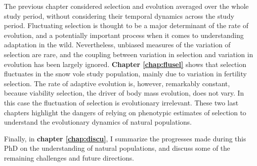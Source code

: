 The previous chapter considered selection and evolution averaged over the whole study period, without considering their temporal dynamics across the study period. Fluctuating selection is thought to be a major determinant of the rate of evolution, and a potentially important process when it comes to understanding adaptation in the wild. 
Nevertheless, unbiased measures of the variation of selection are rare, and the coupling between variation in selection and variation in evolution has been largely ignored. \textbf{Chapter \ref{chap:flusel}} shows that selection fluctuates in the snow vole study population, mainly due to variation in fertility selection. The rate of adaptive evolution is, however, remarkably constant, because viability selection, the driver of body mass evolution, does not vary. In this case the fluctuation of selection is evolutionary irrelevant. These two last chapters highlight the dangers of relying on phenotypic estimates of selection to understand the evolutionary dynamics of natural populations.

Finally, in \textbf{chapter \ref{chap:discu}}, I summarize the progresses made during this PhD on the understanding of natural populations, and discuss some of the remaining challenges and future directions.

\printbibliography[heading=subbibliography]